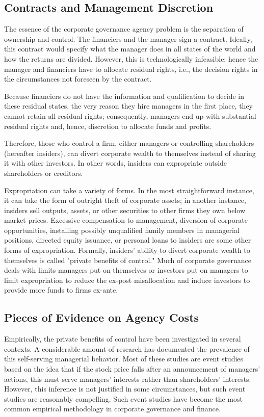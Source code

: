 \documentclass[final,1p,authoryear]{elsarticle}
\begin{document}
\subsection{Contracts and Management Discretion}

The essence of the corporate governance agency problem is the separation of ownership and control. The financiers and the manager sign a contract. Ideally, this contract would specify what the manager does in all states of the world and how the returns are divided. However, this is technologically infeasible; hence the manager and financiers have to allocate residual rights, i.e., the decision rights in the circumstances not foreseen by the contract.

Because financiers do not have the information and qualification to decide in these residual states, the very reason they hire managers in the first place, they cannot retain all residual rights; consequently, managers end up with substantial residual rights and, hence, discretion to allocate funds and profits.

Therefore, those who control a firm, either managers or controlling shareholders (hereafter insiders), can divert corporate wealth to themselves instead of sharing it with other investors. In other words, insiders can expropriate outside shareholders or creditors.

Expropriation can take a variety of forms. In the most straightforward instance, it can take the form of outright theft of corporate assets; in another instance, insiders sell outputs, assets, or other securities to other firms they own below market prices. Excessive compensation to management, diversion of corporate opportunities, installing possibly unqualified family members in managerial positions, directed equity issuance, or personal loans to insiders are some other forms of expropriation. Formally, insiders' ability to divert corporate wealth to themselves is called "private benefits of control." Much of corporate governance deals with limits managers put on themselves or investors put on managers to limit expropriation to reduce the ex-post misallocation and induce investors to provide more funds to firms ex-ante.

\subsection{Pieces of Evidence on Agency Costs}

Empirically, the private benefits of control have been investigated in several contexts. A considerable amount of research has documented the prevalence of this self-serving managerial behavior. Most of these studies are event studies based on the idea that if the stock price falls after an announcement of managers' actions, this must serve managers' interests rather than shareholders' interests. However, this inference is not justified in some circumstances, but such event studies are reasonably compelling. Such event studies have become the most common empirical methodology in corporate governance and finance.
\end{document}
